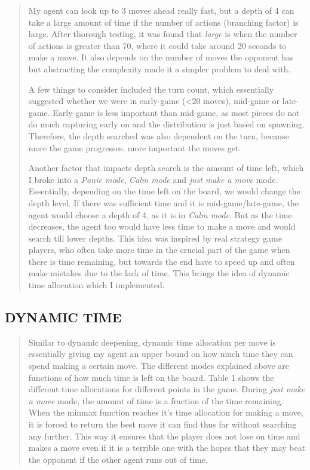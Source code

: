 \documentclass[
]{article}
\begin{document}
\begin{quote}
My agent can look up to 3 moves ahead really fast, but a depth of 4 can
take a large amount of time if the number of actions (branching factor)
is large. After thorough testing, it was found that \emph{large} is when
the number of actions is greater than 70, where it could take around 20
seconds to make a move. It also depends on the number of moves the
opponent has but abstracting the complexity made it a simpler problem to
deal with.

A few things to consider included the turn count, which essentially
suggested whether we were in early-game (\textless20 moves), mid-game or
late-game. Early-game is less important than mid-game, as most pieces do
not do much capturing early on and the distribution is just based on
spawning. Therefore, the depth searched was also dependent on the turn,
because more the game progresses, more important the moves get.

Another factor that impacts depth search is the amount of time left,
which I broke into a \emph{Panic mode}, \emph{Calm mode} and \emph{just
make a move} mode. Essentially, depending on the time left on the board,
we would change the depth level. If there was sufficient time and it is
mid-game/late-game, the agent would choose a depth of 4, as it is in
\emph{Calm mode}. But as the time decreases, the agent too would have
less time to make a move and would search till lower depths. This idea
was inspired by real strategy game players, who often take more time in
the crucial part of the game when there is time remaining, but towards
the end have to speed up and often make mistakes due to the lack of
time. This brings the idea of dynamic time allocation which I
implemented.
\end{quote}

\hypertarget{dynamic-time}{%
\subsection{DYNAMIC TIME}\label{dynamic-time}}

\begin{quote}
Similar to dynamic deepening, dynamic time allocation per move is
essentially giving my agent an upper bound on how much time they can
spend making a certain move. The different modes explained above are
functions of how much time is left on the board. Table 1 shows the
different time allocations for different points in the game. During
\emph{just make a move} mode, the amount of time is a fraction of the
time remaining. When the minmax function reaches it's time allocation
for making a move, it is forced to return the best move it can find thus
far without searching any further. This way it ensures that the player
does not lose on time and makes a move even if it is a terrible one with
the hopes that they may beat the opponent if the other agent runs out of
time.
\end{quote}
\end{document}
